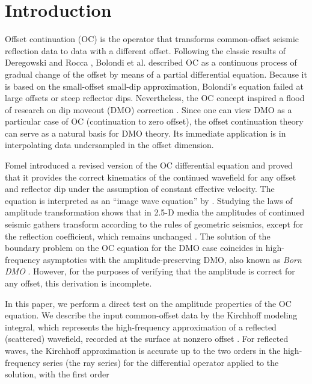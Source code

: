 \section{Introduction}
Offset continuation (OC) is the operator that transforms common-offset
seismic reflection data to data with a different offset. Following the
classic results of Deregowski and Rocca ,
Bolondi et al. 
described OC as a continuous process of gradual change of the offset
by means of a partial differential equation. Because it is based on
the small-offset small-dip approximation, Bolondi's equation failed at
large offsets or steep reflector dips. Nevertheless, the OC concept
inspired a flood of research on dip moveout (DMO) correction
\cite[]{DMP00-00-01300130}. Since one can view DMO as a particular
case of OC (continuation to zero offset), the offset continuation
theory can serve as a natural basis for DMO theory. Its immediate
application is in interpolating data undersampled in the offset
dimension.  \par Fomel  introduced a
revised version of the OC differential equation and proved that it
provides the correct kinematics of the continued wavefield for any
offset and reflector dip under the assumption of constant effective
velocity. The equation is interpreted as an ``image wave equation'' by
\cite{hubral}.  Studying the laws of amplitude transformation shows
that in 2.5-D media the amplitudes of continued seismic gathers
transform according to the rules of geometric seismics, except for the
reflection coefficient, which remains unchanged
\cite[]{joint,GEO68-02-07180732}. The solution of the boundary problem
on the OC equation for the DMO case \cite[]{GEO68-02-07180732}
coincides in high-frequency asymptotics with the amplitude-preserving
DMO, also known as {\em Born DMO}
\cite[]{GEO56-02-01820189,SEG-1990-1366}.  However, for the purposes
of verifying that the amplitude is correct for any offset, this
derivation is incomplete.  \par In this paper, we perform a direct
test on the amplitude properties of the OC equation.  We describe the
input common-offset data by the Kirchhoff modeling integral, which
represents the high-frequency approximation of a reflected (scattered)
wavefield, recorded at the surface at nonzero offset \cite[]{norm}.
For reflected waves, the Kirchhoff approximation is accurate up to the
two orders in the high-frequency series (the ray series) for the
differential operator applied to the solution, with the first order
